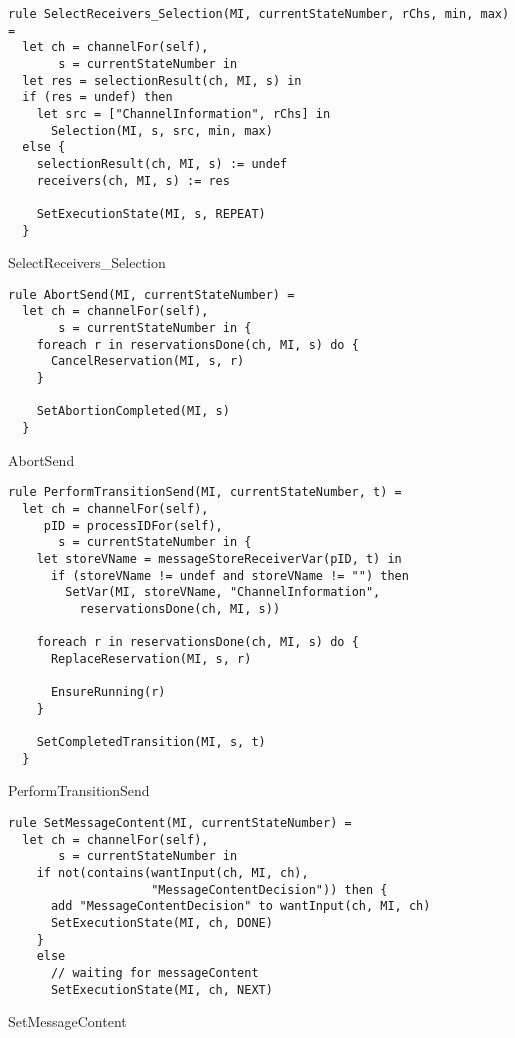 \begin{listing}[H]
\begin{verbatim}
rule SelectReceivers_Selection(MI, currentStateNumber, rChs, min, max) =
  let ch = channelFor(self),
       s = currentStateNumber in
  let res = selectionResult(ch, MI, s) in
  if (res = undef) then
    let src = ["ChannelInformation", rChs] in
      Selection(MI, s, src, min, max)
  else {
    selectionResult(ch, MI, s) := undef
    receivers(ch, MI, s) := res

    SetExecutionState(MI, s, REPEAT)
  }
\end{verbatim}
\caption{SelectReceivers_Selection}
\label{lst:asm:SelectReceivers_Selection}
\end{listing}




\begin{listing}[H]
\begin{verbatim}
rule AbortSend(MI, currentStateNumber) =
  let ch = channelFor(self),
       s = currentStateNumber in {
    foreach r in reservationsDone(ch, MI, s) do {
      CancelReservation(MI, s, r)
    }

    SetAbortionCompleted(MI, s)
  }
\end{verbatim}
\caption{AbortSend}
\label{lst:asm:AbortSend}
\end{listing}




\begin{listing}[H]
\begin{verbatim}
rule PerformTransitionSend(MI, currentStateNumber, t) =
  let ch = channelFor(self),
     pID = processIDFor(self),
       s = currentStateNumber in {
    let storeVName = messageStoreReceiverVar(pID, t) in
      if (storeVName != undef and storeVName != "") then
        SetVar(MI, storeVName, "ChannelInformation",
          reservationsDone(ch, MI, s))

    foreach r in reservationsDone(ch, MI, s) do {
      ReplaceReservation(MI, s, r)

      EnsureRunning(r)
    }

    SetCompletedTransition(MI, s, t)
  }
\end{verbatim}
\caption{PerformTransitionSend}
\label{lst:asm:PerformTransitionSend}
\end{listing}




\begin{listing}[H]
\begin{verbatim}
rule SetMessageContent(MI, currentStateNumber) =
  let ch = channelFor(self),
       s = currentStateNumber in
    if not(contains(wantInput(ch, MI, ch),
                    "MessageContentDecision")) then {
      add "MessageContentDecision" to wantInput(ch, MI, ch)
      SetExecutionState(MI, ch, DONE)
    }
    else
      // waiting for messageContent
      SetExecutionState(MI, ch, NEXT)
\end{verbatim}
\caption{SetMessageContent}
\label{lst:asm:SetMessageContent}
\end{listing}




